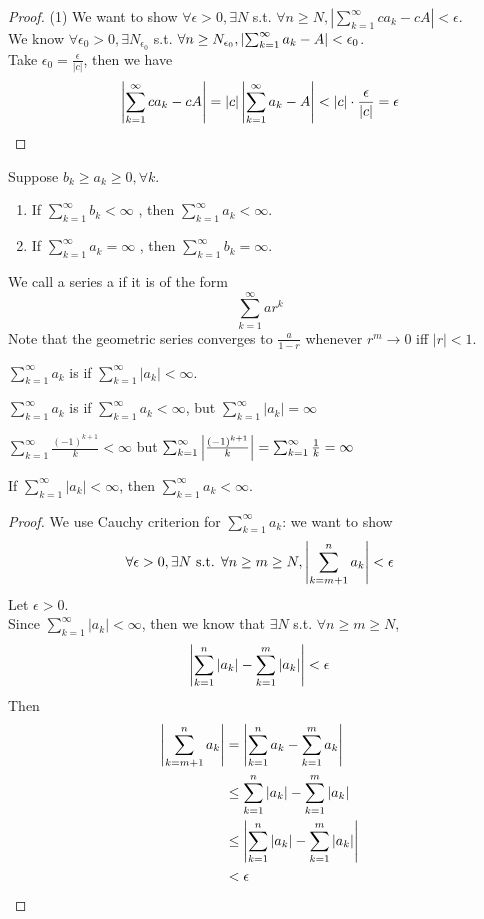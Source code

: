 \documentclass[11pt]{article}
\begin{document}
\begin{proof}
	(1) We want to show $\forall \epsilon > 0, \exists N$ s.t. $\forall n \geq N, \left | \sum_{k=1}^\infty ca_k - cA\right | < \epsilon$. \\
	We know $\forall \epsilon_0 > 0, \exists N_{\epsilon_0}$ s.t. $\forall n \geq N_{\epsilon_0}, \left \vert {\sum_{k=1}^\infty a_k - A} \right \vert < \epsilon_0$.\\
	Take $\epsilon_0 = \frac{\epsilon}{|c|}$, then we have
	$$\left \vert {\sum_{k=1}^\infty ca_k - cA} \right \vert = |c|\left \vert {\sum_{k=1}^\infty a_k - A} \right \vert < |c|\cdot\frac{\epsilon}{|c|} = \epsilon$$
\end{proof}

 Suppose $b_k \geq a_k \geq 0, \forall k$.\\
\begin{enumerate}
	\item If $\sum_{k=1}^\infty b_k < \infty$ , then $\sum_{k=1}^\infty a_k < \infty$.
	\item If $\sum_{k=1}^\infty a_k = \infty$ , then $\sum_{k=1}^\infty b_k = \infty$.
\end{enumerate}

We call a series a  if it is of the form
$$\sum_{k=1}^\infty ar^k$$
Note that the geometric series converges to $\frac{a}{1-r}$ whenever $r^m \rightarrow 0$ iff $|r| < 1$.

$\sum_{k=1}^\infty a_k$ is  if $\sum_{k=1}^\infty |a_k| < \infty$. 

$\sum_{k=1}^\infty a_k$ is  if $\sum_{k=1}^\infty a_k < \infty$, but $\sum_{k=1}^\infty |a_k| = \infty$

$\sum_{k=1}^\infty \frac{(-1)^{k+1}}{k} < \infty$ but $\sum_{k=1}^\infty \left \vert {\frac{(-1)^{k+1}}{k}} \right \vert = \sum_{k=1}^\infty \frac{1}{k} = \infty$

If $\sum_{k=1}^\infty |a_k| < \infty$, then $\sum_{k=1}^\infty a_k < \infty$.

\begin{proof}
	We use Cauchy criterion for $\sum_{k=1}^\infty a_k$: we want to show
	$$\forall \epsilon > 0, \exists N \text{ s.t. } \forall n \geq m\geq N, \left \vert {\sum_{k = m+1}^n a_k} \right \vert < \epsilon$$
	Let $\epsilon > 0$.\\
	Since $\sum_{k=1}^\infty |a_k| < \infty$, then we know that $\exists N$ s.t. $\forall n \geq m \geq N$,
	$$\left \vert {\sum_{k=1}^n|a_k| - \sum_{k=1}^m|a_k|} \right \vert < \epsilon$$
	Then
	\begin{align*}
		\left \vert {\sum_{k = m+1}^n a_k} \right \vert &= \left \vert {\sum_{k=1}^na_k - \sum_{k=1}^ma_k} \right \vert\\
		&\leq \sum_{k=1}^n|a_k| - \sum_{k=1}^m|a_k| \\
		&\leq \left \vert {\sum_{k=1}^n|a_k| - \sum_{k=1}^m|a_k|} \right \vert\\
		&< \epsilon
	\end{align*}
\end{proof}
\end{document}
